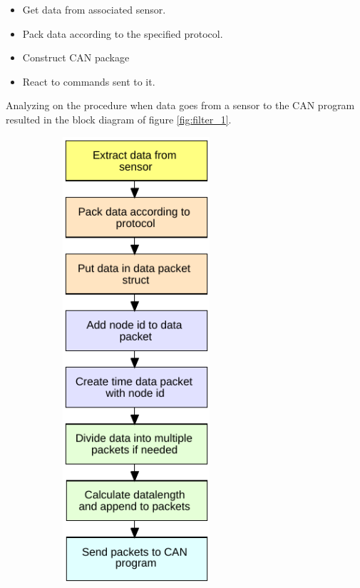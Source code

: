 \begin{itemize}
\item Get data from associated sensor.
\item Pack data according to the specified protocol.
\item Construct CAN package
\item React to commands sent to it.
\end{itemize}

Analyzing on the procedure when data goes from a sensor to the CAN program resulted in the block diagram of figure \ref{fig:filter_1}.

\begin{figure}[!h]
    \centering
    \begin{subfigure}{0.45\textwidth}
    \centering
        \includegraphics[width=0.60\textwidth]{graphics/FlowChart_Node_Packing}

\end{subfigure}
\end{figure}
